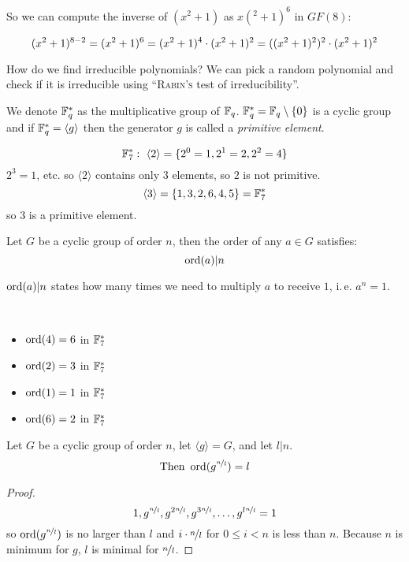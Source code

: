So we can compute the inverse of $(x^2+1)$ as $x(^2+1)^6$ in $GF(8)$:

\[
	(x^2+1)^{8-2} = (x^2+1)^6 = (x^2+1)^4 \cdot (x^2+1)^2 = \large((x^2+1)^2\large)^2 \cdot (x^2+1)^2
\]

How do we find irreducible polynomials? We can pick a random polynomial and check if it is irreducible using ``\textsc{Rabin's} test of irreducibility''.

\begin{notation}
We denote $\mathbb{F}_q^{\ast}$ as  the multiplicative group of $\mathbb{F}_q$. $\mathbb{F}_q^{\ast} = \mathbb{F}_q \setminus \{0\}$ is a cyclic group and if $\mathbb{F}_q^{\ast} = \langle g \rangle$ then the generator $g$ is called a \emph{primitive element}.
\end{notation}

\begin{example}
\[
	\mathbb{F}_7^{\ast}: \,\, \langle 2 \rangle = \{2^0=1,2^1=2,2^2=4\}
\]
$2^3=1$, etc. so $\langle 2 \rangle$ contains only $3$ elements, so $2$ is not primitive.
\[
\langle 3 \rangle = \{1,3,2,6,4,5\} = \mathbb{F}_7^{\ast}
\]
so  $3$ is a primitive element.
\end{example}

\begin{lemma}
Let $G$ be a cyclic group of order $n$, then the order of any $a\in G$ satisfies:
\[
	\operatorname{ord}(a)|n
\]
\end{lemma}
\begin{remark}
$\operatorname{ord}(a)|n$ states how many times we need to multiply $a$ to receive $1$, i.\,e. $a^n=1$.
\end{remark}

\begin{example}\ \\
\begin{itemize}
\item $\operatorname{ord}(4) = 6$ in $\mathbb{F}_7^{\ast}$
\item $\operatorname{ord}(2) = 3$ in $\mathbb{F}_7^{\ast}$
\item $\operatorname{ord}(1) = 1$ in $\mathbb{F}_7^{\ast}$
\item $\operatorname{ord}(6) = 2$ in $\mathbb{F}_7^{\ast}$
\end{itemize}
\end{example}

\begin{lemma}
Let $G$ be a cyclic group of order $n$, let $\langle g \rangle = G$, and let $l|n$.
\[
\text{Then } \operatorname{ord}(g^{\nicefrac{n}{l}}) = l
\]
\begin{proof}
\[
1, g^{\nicefrac{n}{l}}, g^{2\nicefrac{n}{l}}, g^{3\nicefrac{n}{l}}, \dots, g^{l\nicefrac{n}{l}} = 1
\]
so $\operatorname{ord}(g^{\nicefrac{n}{l}})$ is no larger than $l$ and $i \cdot \nicefrac{n}{l}$ for $0 \leq i < n$ is less than $n$. Because $n$ is minimum for $g$, $l$ is minimal for $\nicefrac{n}{l}$.
\end{proof}
\end{lemma}

